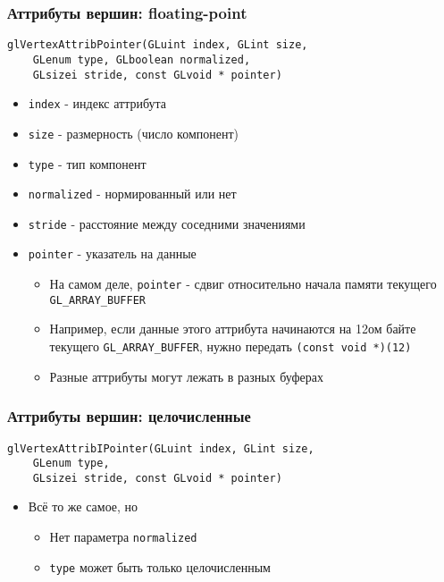 \documentclass{beamer}
\begin{document}
\begin{frame}[fragile]
\frametitle{Аттрибуты вершин: floating-point}
\begin{verbatim}
glVertexAttribPointer(GLuint index, GLint size,
    GLenum type, GLboolean normalized,
    GLsizei stride, const GLvoid * pointer)
\end{verbatim}
\pause
\begin{itemize}
\item \verb|index| - индекс аттрибута
\pause
\item \verb|size| - размерность (число компонент)
\pause
\item \verb|type| - тип компонент
\pause
\item \verb|normalized| - нормированный или нет
\pause
\item \verb|stride| - расстояние между соседними значениями
\pause
\item \verb|pointer| - указатель на данные
\pause
\begin{itemize}
\item На самом деле, \verb|pointer| - сдвиг относительно начала памяти текущего \verb|GL_ARRAY_BUFFER|
\item Например, если данные этого аттрибута начинаются на 12ом байте текущего \verb|GL_ARRAY_BUFFER|, нужно передать \verb|(const void *)(12)|
\pause
\item Разные аттрибуты могут лежать в разных буферах
\end{itemize}
\end{itemize}
\end{frame}

\begin{frame}[fragile]
\frametitle{Аттрибуты вершин: целочисленные}
\begin{verbatim}
glVertexAttribIPointer(GLuint index, GLint size,
    GLenum type,
    GLsizei stride, const GLvoid * pointer)
\end{verbatim}
\begin{itemize}
\item Всё то же самое, но 
\begin{itemize}
\item Нет параметра \verb|normalized|
\item \verb|type| может быть только целочисленным
\end{itemize}
\end{itemize}
\end{frame}
\end{document}
